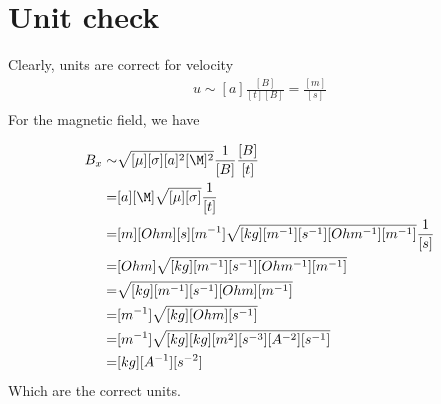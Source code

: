 \documentclass[11pt]{article}
\begin{document}
\section{Unit check}
Clearly, units are correct for velocity
\begin{equation}\begin{aligned}
u  \sim [a] \frac{[B]}{[t] [B]} = \frac{[m]}{[s]} \\
\end{aligned} \end{equation}
For the magnetic field, we have

\begin{equation}\begin{aligned}
B_x \sim & \sqrt{[\mu] [\sigma] [a]^2 [\M]^2} \frac{1}{[B]} \frac{[B]}{[t]}  \\
       = & [a] [\M] \sqrt{[\mu] [\sigma]} \frac{1}{[t]} \\
       = & [m] [Ohm] [s] [m^{-1}] \sqrt{[kg] [m^{-1}] [s^{-1}] [Ohm^{-1}] [m^{-1}]} \frac{1}{[s]} \\
       = & [Ohm] \sqrt{[kg] [m^{-1}] [s^{-1}] [Ohm^{-1}] [m^{-1}]} \\
       = & \sqrt{[kg] [m^{-1}] [s^{-1}] [Ohm] [m^{-1}]} \\
       = & [m^{-1}] \sqrt{[kg] [Ohm] [s^{-1}]} \\
       = & [m^{-1}] \sqrt{[kg] [kg] [m^2] [s^{-3}] [A^{-2}] [s^{-1}]} \\
       = & [kg] [A^{-1}] [s^{-2}] \\
\end{aligned} \end{equation}
Which are the correct units.
\end{document}
